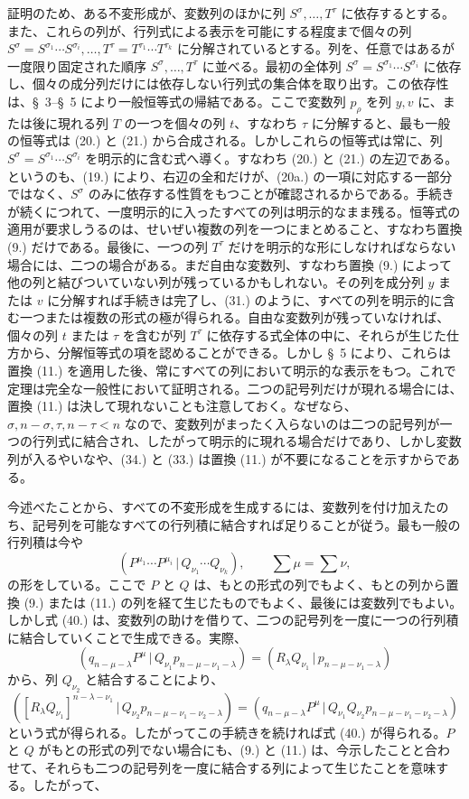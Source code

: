 \documentclass[11pt]{article}
\newcommand{\pair}[2]{(#1\,|\,#2)}
\begin{document}
証明のため、ある不変形成が、変数列のほかに列 $S^\sigma,\ldots,T^\tau$ に依存するとする。また、これらの列が、行列式による表示を可能にする程度まで個々の列 $S^\sigma=S^{\sigma_1}\cdots S^{\sigma_i},\ldots,T^\tau=T^{\tau_1}\cdots T^{\tau_k}$ に分解されているとする。列を、任意ではあるが一度限り固定された順序 $S^\sigma,\ldots,T^\tau$ に並べる。最初の全体列 $S^\sigma=S^{\sigma_1}\cdots S^{\sigma_i}$ に依存し、個々の成分列だけには依存しない行列式の集合体を取り出す。この依存性は、\S\ 3--\S\ 5 により一般恒等式の帰結である。ここで変数列 $p_\rho$ を列 $y,v$ に、または後に現れる列 $T$ の一つを個々の列 $t$、すなわち $\tau$ に分解すると、最も一般の恒等式は (20.) と (21.) から合成される。しかしこれらの恒等式は常に、列 $S^\sigma=S^{\sigma_1}\cdots S^{\sigma_i}$ を明示的に含む式へ導く。すなわち (20.) と (21.) の左辺である。というのも、(19.) により、右辺の全和だけが、(20a.) の一項に対応する一部分ではなく、$S^\sigma$ のみに依存する性質をもつことが確認されるからである。手続きが続くにつれて、一度明示的に入ったすべての列は明示的なまま残る。恒等式の適用が要求しうるのは、せいぜい複数の列を一つにまとめること、すなわち置換 (9.) だけである。最後に、一つの列 $T^\tau$ だけを明示的な形にしなければならない場合には、二つの場合がある。まだ自由な変数列、すなわち置換 (9.) によって他の列と結びついていない列が残っているかもしれない。その列を成分列 $y$ または $v$ に分解すれば手続きは完了し、(31.) のように、すべての列を明示的に含む一つまたは複数の形式の極が得られる。自由な変数列が残っていなければ、個々の列 $t$ または $\tau$ を含むが列 $T^\tau$ に依存する式全体の中に、それらが生じた仕方から、分解恒等式の項を認めることができる。しかし \S\ 5 により、これらは置換 (11.) を適用した後、常にすべての列において明示的な表示をもつ。これで定理は完全な一般性において証明される。二つの記号列だけが現れる場合には、置換 (11.) は決して現れないことも注意しておく。なぜなら、$\sigma,n-\sigma,\tau,n-\tau<n$ なので、変数列がまったく入らないのは二つの記号列が一つの行列式に結合され、したがって明示的に現れる場合だけであり、しかし変数列が入るやいなや、(34.) と (33.) は置換 (11.) が不要になることを示すからである。

今述べたことから、すべての不変形成を生成するには、変数列を付け加えたのち、記号列を可能なすべての行列積に結合すれば足りることが従う。最も一般の行列積は今や
\begin{equation}
 \pair{P^{\mu_1}\cdots P^{\mu_i}}{Q_{\nu_1}\cdots Q_{\nu_k}},\qquad \sum\mu=\sum\nu,
\tag{40}
\end{equation}
の形をしている。ここで $P$ と $Q$ は、もとの形式の列でもよく、もとの列から置換 (9.) または (11.) の列を経て生じたものでもよく、最後には変数列でもよい。しかし式 (40.) は、変数列の助けを借りて、二つの記号列を一度に一つの行列積に結合していくことで生成できる。実際、
\[
 \pair{q_{n-\mu-\lambda}P^\mu}{Q_{\nu_1}p_{n-\mu-\nu_1-\lambda}}=\pair{R_\lambda Q_{\nu_1}}{p_{n-\mu-\nu_1-\lambda}}
\]
から、列 $Q_{\nu_2}$ と結合することにより、
\[
 \pair{[R_\lambda Q_{\nu_1}]^{n-\lambda-\nu_1}}{Q_{\nu_2}p_{n-\mu-\nu_1-\nu_2-\lambda}}
 =\pair{q_{n-\mu-\lambda}P^\mu}{Q_{\nu_1}Q_{\nu_2}p_{n-\mu-\nu_1-\nu_2-\lambda}}
\]
という式が得られる。したがってこの手続きを続ければ式 (40.) が得られる。$P$ と $Q$ がもとの形式の列でない場合にも、(9.) と (11.) は、今示したことと合わせて、それらも二つの記号列を一度に結合する列によって生じたことを意味する。したがって、
\end{document}
